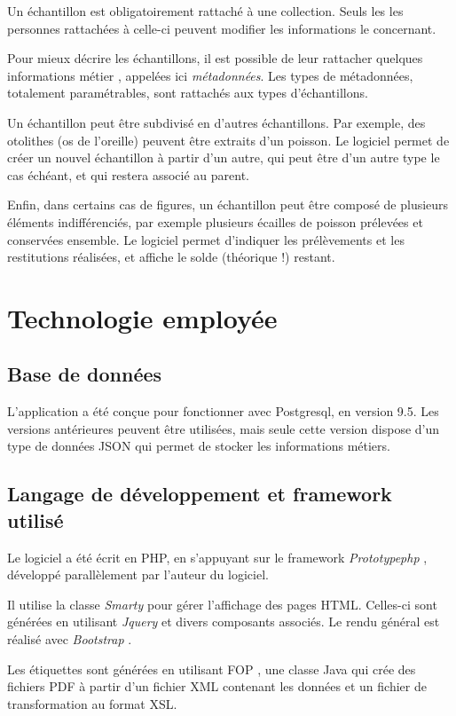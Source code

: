 Un échantillon est obligatoirement rattaché à une collection. Seuls les les personnes rattachées à celle-ci peuvent modifier les informations le concernant. 

Pour mieux décrire les échantillons, il est possible de leur rattacher quelques informations \og métier \fg{}, appelées ici \textit{métadonnées}. Les types de métadonnées, totalement paramétrables, sont rattachés aux types d'échantillons.

Un échantillon peut être subdivisé en d'autres échantillons. Par exemple, des otolithes (os de l'oreille) peuvent être extraits d'un poisson. Le logiciel permet de créer un nouvel échantillon à partir d'un autre, qui peut être d'un autre type le cas échéant, et qui restera associé au parent. 

Enfin, dans certains cas de figures, un échantillon peut être composé de plusieurs éléments indifférenciés, par exemple plusieurs écailles de poisson prélevées et conservées ensemble. Le logiciel permet d'indiquer les prélèvements et les restitutions réalisées, et affiche le solde (théorique !) restant.

\section{Technologie employée}
\subsection{Base de données}

L'application a été conçue pour fonctionner avec Postgresql, en version 9.5. Les versions antérieures peuvent être utilisées, mais seule cette version dispose d'un type de données JSON qui permet de stocker les informations métiers.

\subsection{Langage de développement et framework utilisé}
Le logiciel a été écrit en PHP, en s'appuyant sur le framework \textit{Prototypephp} \cite{prototypephp}, développé parallèlement par l'auteur du logiciel.

Il utilise la classe \textit{Smarty} \cite{smarty} pour gérer l'affichage des pages HTML. Celles-ci sont générées en utilisant \textit{Jquery} \cite{jquery}  et divers composants associés. Le rendu général est réalisé avec \textit{Bootstrap} \cite{bootstrap}.

Les étiquettes sont générées en utilisant FOP \cite{fop}, une classe Java qui crée des fichiers PDF à partir d'un fichier XML contenant les données et un fichier de transformation au format XSL.

